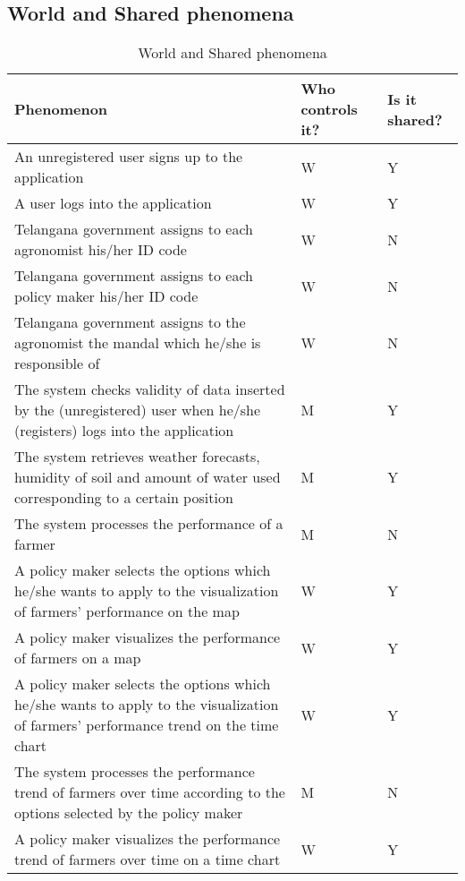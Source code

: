 \subsection{World and Shared phenomena}

\begin{center}
    
\setlength\tabcolsep{7pt}
\renewcommand{\arraystretch}{2}
\begin{longtable}{ |m{7cm}|C{2.3cm}|C{1.6cm}|}
\caption{World and Shared phenomena\label{long}}\\
\hline
\endfirsthead
\endhead
\hline
\endlastfoot
{}
\textbf{Phenomenon} & \textbf{Who controls it?} & \textbf{Is it shared?}\\
\hline

An unregistered user signs up to the application & W & Y\\
A user logs into the application & W & Y\\
Telangana government assigns to each agronomist his/her ID code & W & N\\
Telangana government assigns to each policy maker his/her ID code & W & N\\
Telangana government assigns to the agronomist the mandal which he/she is responsible of & W & N\\
The system checks validity of data inserted by the (unregistered) user when he/she (registers) logs into the application & M & Y\\
The system retrieves weather forecasts, humidity of soil and amount of water used corresponding to a certain position & M & Y\\
The system processes the performance of a farmer & M & N\\
A policy maker selects the options which he/she wants to apply to the visualization of farmers' performance on the map & W & Y\\
A policy maker visualizes the performance of farmers on a map & W & Y\\
A policy maker selects the options which he/she wants to apply to the visualization of farmers' performance trend on the time chart & W & Y\\
The system processes the performance trend of farmers over time according to the options selected by the policy maker & M & N\\
A policy maker visualizes the performance trend of farmers over time on a time chart & W & Y\\

\end{longtable}
\end{center}
